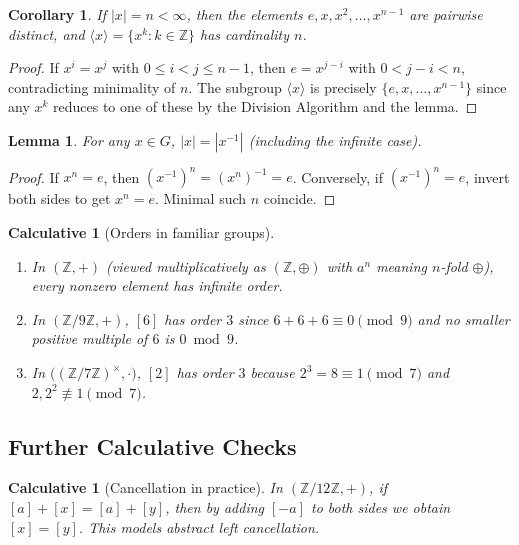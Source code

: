 \documentclass[12pt]{article}
\newtheorem{lemma}[theorem]{Lemma}
\newtheorem{corollary}[theorem]{Corollary}
\newtheorem{calculative}[theorem]{Calculative}
\theoremstyle{definition}
\begin{document}
\begin{corollary}
If $|x|=n<\infty$, then the elements $e,x,x^2,\dots,x^{n-1}$ are pairwise distinct, and $\langle x\rangle=\{x^k:k\in\mathbb{Z}\}$ has cardinality $n$.
\end{corollary}

\begin{proof}
If $x^i=x^j$ with $0\le i<j\le n-1$, then $e=x^{j-i}$ with $0<j-i<n$, contradicting minimality of $n$. The subgroup $\langle x\rangle$ is precisely
$\{e,x,\dots,x^{n-1}\}$ since any $x^k$ reduces to one of these by the Division Algorithm and the lemma.
\end{proof}

\begin{lemma}
For any $x\in G$, $|x|=|x^{-1}|$ (including the infinite case).
\end{lemma}

\begin{proof}
If $x^n=e$, then $(x^{-1})^n=(x^n)^{-1}=e$. Conversely, if $(x^{-1})^n=e$, invert both sides to get $x^n=e$. Minimal such $n$ coincide.
\end{proof}

\begin{calculative}[Orders in familiar groups]
\begin{enumerate}
    \item In $(\mathbb{Z},+)$ (viewed multiplicatively as $(\mathbb{Z},\oplus)$ with $a^{n}$ meaning $n$-fold $\oplus$), every nonzero element has infinite order.
    \item In $(\mathbb{Z}/9\mathbb{Z},+)$, $[6]$ has order $3$ since $6+6+6\equiv 0\pmod{9}$ and no smaller positive multiple of $6$ is $0\bmod 9$.
    \item In $\big((\mathbb{Z}/7\mathbb{Z})^\times,\cdot\big)$, $[2]$ has order $3$ because $2^3=8\equiv 1\pmod{7}$ and $2,2^2\not\equiv 1\pmod{7}$.
\end{enumerate}
\end{calculative}

\subsection*{Further Calculative Checks}

\begin{calculative}[Cancellation in practice]
In $(\mathbb{Z}/12\mathbb{Z},+)$, if $[a]+[x]=[a]+[y]$, then by adding $[-a]$ to both sides we obtain $[x]=[y]$. This models abstract left cancellation.
\end{calculative}
\end{document}
